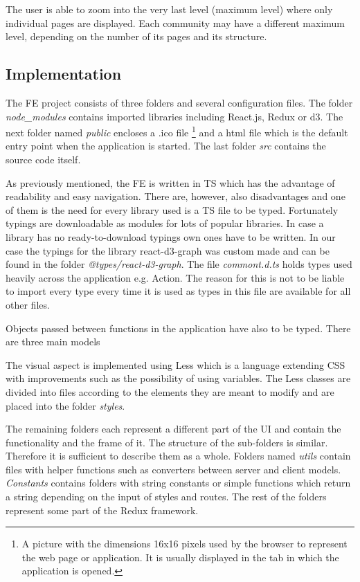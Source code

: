 The user is able to zoom into the very last level (maximum level) where only individual pages are displayed. Each community may have a different maximum level, depending on the number of its pages and its structure.

\subsection{Implementation}
The FE project consists of three folders and several configuration files. The folder \textit{node\_modules} contains imported libraries including React.js, Redux or d3. The next folder named \textit{public} encloses a .ico file \footnote {A picture with the dimensions 16x16 pixels used by the browser to represent the web page or application. It is usually displayed in the tab in which the application is opened.} and a html file which is the default entry point when the application is started. The last folder \textit{src} contains the source code itself. 

As previously mentioned, the FE is written in TS which has the advantage of readability and easy navigation. There are, however, also disadvantages and one of them is the need for every library used is a TS file to be typed. Fortunately typings are downloadable as modules for lots of popular libraries. In case a library has no ready-to-download typings own ones have to be written. In our case the typings for the library react-d3-graph was custom made and can be found in the folder \textit{@types/react-d3-graph}. The file \textit{commont.d.ts} holds types used heavily across the application e.g. Action. The reason for this is not to be liable to import every type every time it is used as types in this file are available for all other files. 

Objects passed between functions in the application have also to be typed. There are three main models

The visual aspect is implemented using Less \cite{less} which is a language extending CSS with improvements such as the possibility of using variables. The Less classes are divided into files according to the elements they are meant to modify and are placed into the folder \textit{styles}. 

The remaining folders each represent a different part of the UI and contain the functionality and the frame of it. The structure of the sub-folders is similar. Therefore it is sufficient to describe them as a whole. Folders named \textit{utils} contain files with helper functions such as converters between server and client models. \textit{Constants} contains folders with string constants or simple functions which return a string depending on the input  of styles and routes. The rest of the folders represent some part of the Redux framework. 

